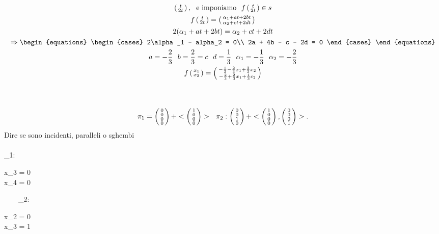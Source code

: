 \documentclass[12px]{article}
\begin{document}
\begin{gather*}
	\icol{t \\2t}, \ \ \text{e imponiamo} \ \ f\icol{t\\2t}\in s \\
	f\icol{t\\2t} = \icol{\alpha_1 + at + 2bt\\\alpha_2 + ct + 2dt} \\
	2(\alpha_1 + at + 2bt) = \alpha_2 + ct + 2dt \\
	\Rightarrow 
	\begin{equations}
		\begin{cases}
			2\alpha_1 - alpha_2 = 0\\
			2a + 4b - c - 2d = 0 
		\end{cases}
	\end{equations}\\
	a = - \frac{2}{3} \ \ b = \frac{2}{3} = c \ \ d = \frac{1}{3} \ \ \alpha_1 = - \frac{1}{3} \ \ \alpha_2 = - \frac{2}{3} \\
	f\icol{x_1 \\ x_2} = \icol{-\frac{1}{3} -\frac{2}{3}x_1 + \frac{2}{3}x_2\\ - \frac{2}{3} + \frac{2}{3}x_1 + \frac{1}{3}c_2}
\end{gather*}
\\
\hfill \ \\
\[
	\pi_1 = \left(\begin{smallmatrix}0 \\ 0\\ 0\\ 0 \end{smallmatrix}\right) + <\left(\begin{smallmatrix}1 \\ 0\\0\\0\end{smallmatrix}\right)> \ \ \pi_2: \left(\begin{smallmatrix}0\\0\\1\\0\end{smallmatrix}\right) + <\left(\begin{smallmatrix}1 \\ 0 \\0 \\0\end{smallmatrix}\right),\left(\begin{smallmatrix}0\\0\\0\\1\end{smallmatrix}\right)>
.\] 
Dire se sono incidenti, paralleli o sghembi\\
\hfill
\\
\pi_1: \begin{equations}
	\begin{cases}
		x_3 = 0 \\
		x_4 = 0
	\end{cases}
\end{equations} \ \ \ \ 
\pi_2: \begin{equations}
	\begin{cases}
		x_2 = 0\\
		x_3 = 1
	\end{cases}
\end{equations}
\end{document}
